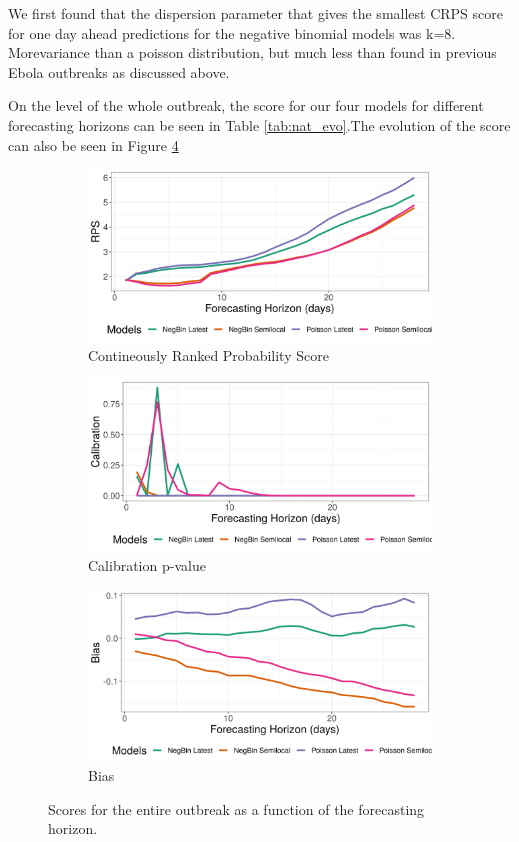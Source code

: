 \documentclass[12pt]{article}
\begin{document}
We first found that the dispersion parameter that gives the smallest CRPS score for one day ahead predictions for the negative binomial models was k=8. Morevariance than a poisson distribution, but much less than found in previous Ebola outbreaks as discussed above. 

On the level of the whole outbreak, the score for our four models for different forecasting horizons can be seen in Table \ref{tab:nat_evo}.The evolution of the score can also be seen in Figure \ref{fig:nat_scores}



\begin{figure}[h]
\begin{subfigure}{\textwidth}
  \centering
  \includegraphics[width=0.7\linewidth]{../output/national_crps.png}  
  \caption{Contineously Ranked Probability Score}
  \label{fig:sub-first}
\end{subfigure}

\begin{subfigure}{\textwidth}
  \centering
  \includegraphics[width=0.7\linewidth]{../output/national_calibration.png}  
  \caption{Calibration p-value}
  \label{fig:sub-second}
\end{subfigure}
\begin{subfigure}{\textwidth}
  \centering
  \includegraphics[width=0.7\linewidth]{../output/national_bias.png}  
  \caption{Bias}
  \label{fig:sub-third}
\end{subfigure}
  \caption{Scores for the entire outbreak as a function of the forecasting horizon.}

  \label{fig:nat_scores}
\end{figure}
\end{document}
